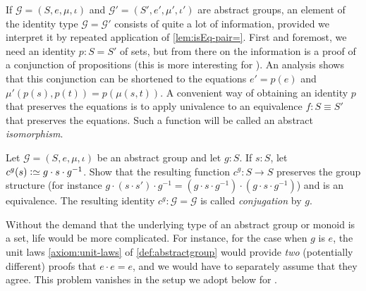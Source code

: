 \begin{remark}
  If $\mathcal G=(S,e,\mu,\iota)$ and $\mathcal G'=(S',e',\mu',\iota')$ are abstract groups, an element of the identity type $\mathcal
  G=\mathcal G'$ consists of quite a lot of information, provided we interpret it by repeated application of \cref{lem:isEq-pair=}.  First and
  foremost, we need an identity $p:S=S'$ of sets, but from there on the information is a proof of a conjunction of propositions (this is more
  interesting for \inftygps).  An analysis shows that this conjunction can be shortened to the equations $e'=p(e)$ and
  $\mu'(p(s),p(t))=p(\mu(s,t))$.  A convenient way of obtaining an identity $p$ that preserves the equations is to apply univalence to an
  equivalence $f: S \equiv S'$ that preserves the equations.  Such a function will be called an abstract \emph{isomorphism}.
\end{remark}

\begin{xca}
  \label{xca:conj}
  Let $\mathcal G=(S,e,\mu,\iota)$ be an abstract group and let $g:S$.  If $s:S$, let $c^g(s)\defequi g\cdot s\cdot g^{-1}$.  Show that the resulting function $c^g:S\to S$ preserves the group structure (for instance $g\cdot(s\cdot s')\cdot g^{-1}=(g\cdot s\cdot g^{-1} )\cdot(g\cdot s\cdot g^{-1})$) and is an equivalence.  The resulting identity $c^g:\mathcal G=\mathcal G$ is called \emph{conjugation} by $g$.
\end{xca}

  \begin{remark}
    Without the demand that the underlying type of an abstract group or monoid is a set, life would be more complicated.  For instance, for the
    case when $g$ is $e$, the unit laws \ref{axiom:unit-laws} of \cref{def:abstractgroup} would provide \emph{two} (potentially different)
    proofs that $e\cdot e = e$, and we would have to separately assume that they agree.  This problem vanishes in the setup we adopt below for
    \inftygps.
  \end{remark}

